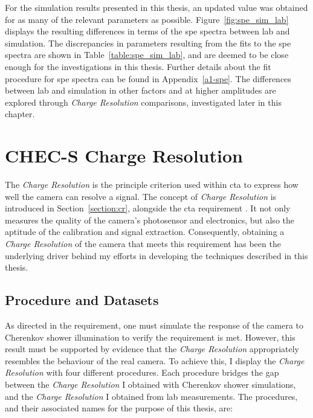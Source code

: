 For the simulation results presented in this thesis, an updated value was obtained for as many of the relevant  parameters as possible. Figure~\ref{fig:spe_sim_lab} displays the resulting differences in terms of the \gls{spe} spectra between lab and simulation. The discrepancies in parameters resulting from the fits to the \gls{spe} spectra are shown in Table~\ref{table:spe_sim_lab}, and are deemed to be close enough for the investigations in this thesis. Further details about the fit procedure for \gls{spe} spectra can be found in Appendix~\ref{a1-spe}. The differences between lab and simulation in other factors and at higher amplitudes are explored through \textit{Charge Resolution} comparisons, investigated later in this chapter.

\section{CHEC-S Charge Resolution}

The \textit{Charge Resolution} is the principle criterion used within \gls{cta} to express how well the camera can resolve a signal. The concept of \textit{Charge Resolution} is introduced in Section~\ref{section:cr}, alongside the \gls{cta} requirement . It not only measures the quality of the camera's photosensor and electronics, but also the aptitude of the calibration and signal extraction. Consequently, obtaining a \textit{Charge Resolution} of the camera that meets this requirement has been the underlying driver behind my efforts in developing the techniques described in this thesis.

\subsection{Procedure and Datasets} \label{section:crprocedure}

As directed in the  requirement, one must simulate the response of the camera to Cherenkov shower illumination to verify the requirement is met. However, this result must be supported by evidence that the \textit{Charge Resolution} appropriately resembles the behaviour of the real camera. To achieve this, I display the \textit{Charge Resolution} with four different procedures. Each procedure bridges the gap between the \textit{Charge Resolution} I obtained with Cherenkov shower simulations, and the \textit{Charge Resolution} I obtained from lab measurements. The procedures, and their associated names for the purpose of this thesis, are:

